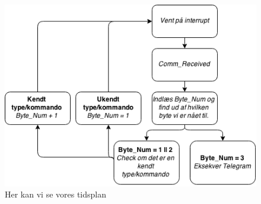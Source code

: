 \begin{figure}[h]
	\centering
		\includegraphics[scale=0.75]{Billeder/Comm_Modtagelse.png}
	\caption{Her kan vi se vores tidsplan}
	\label{fig:tidsplan}
\end{figure}